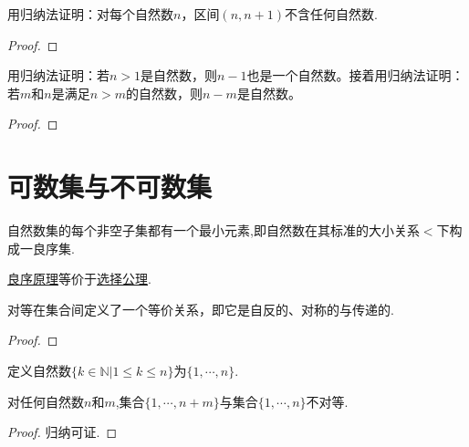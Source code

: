 \documentclass[lang=cn,newtx,10pt,scheme=chinese]{../Template/elegantbook}
\begin{document}
\begin{example}\label{example-1111}
  用归纳法证明：对每个自然数\(n\)，区间\((n, n + 1)\)不含任何自然数.
\end{example}
\begin{proof}
  

\end{proof}

\begin{example}\label{example-9}
用归纳法证明：若\(n > 1\)是自然数，则\(n - 1\)也是一个自然数。接着用归纳法证明：若\(m\)和\(n\)是满足\(n>m\)的自然数，则\(n - m\)是自然数。
\end{example}
\begin{proof}
  

\end{proof}





\section{可数集与不可数集}

\begin{axiom}[良序原理]\label{theorem:良序原理}
  自然数集的每个非空子集都有一个最小元素,即自然数在其标准的大小关系$<$下构成一良序集.
\end{axiom}
\begin{note}
  \hyperref[theorem:良序原理]{良序原理}等价于\hyperref[axiom:Zermelo选择公理]{选择公理}.
\end{note}

\begin{proposition}\label{proposition:集合之间的对等是一个等价关系}
  对等在集合间定义了一个等价关系，即它是自反的、对称的与传递的.
\end{proposition}
\begin{proof}
  

\end{proof}

\begin{definition}[自然数]\label{definition:自然数}
  定义自然数\(\{k\in\mathbb{N}|1\leqslant k\leqslant n\}\)为\(\{1, \cdots, n\}\).
\end{definition}

\begin{theorem}[鸽笼原理]\label{theorem:鸽笼原理}
  对任何自然数\(n\)和\(m\),集合\(\{1, \cdots, n + m\}\)与集合\(\{1, \cdots, n\}\)不对等.
\end{theorem}
\begin{proof}
  归纳可证.

\end{proof}
\end{document}
